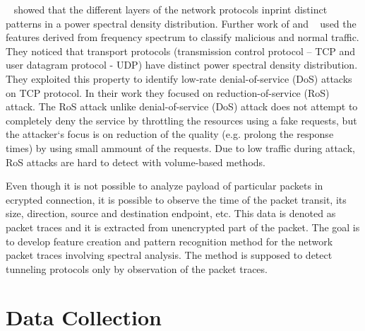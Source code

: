~\cite{he2004spectral} showed that the different layers of the network
protocols inprint distinct patterns in a power spectral density distribution. 
Further work of  and ~\cite{chen2007spectral}
used the features derived %
from frequency spectrum to classify malicious and normal traffic.
They noticed that transport protocols (transmission control protocol --
TCP and user datagram protocol - UDP) 
have distinct power spectral density distribution. 
They exploited this property to identify low-rate denial-of-service (DoS)
attacks on TCP protocol. %
In %
their work they focused on reduction-of-service (RoS) attack.
The RoS attack unlike denial-of-service (DoS) attack does not attempt to completely deny the
service by throttling the resources using a fake requests, but the attacker`s focus is on 
reduction of the quality (e.g. prolong the response times) 
by using small ammount of the requests. 
Due to low traffic during attack, RoS attacks are hard to detect with volume-based methods.


Even though it is not possible to analyze payload of particular packets in 
ecrypted connection, it is possible to observe the time of the packet transit, 
its size, direction, source and destination endpoint, etc. 
This data is denoted as packet traces and it is extracted from unencrypted 
part of the packet. 
The goal is to develop feature creation and pattern recognition method for 
the network packet traces involving spectral analysis.
The method is supposed to detect tunneling protocols only by observation 
of the packet traces.

\section{Data Collection}\label{sec:collect}

